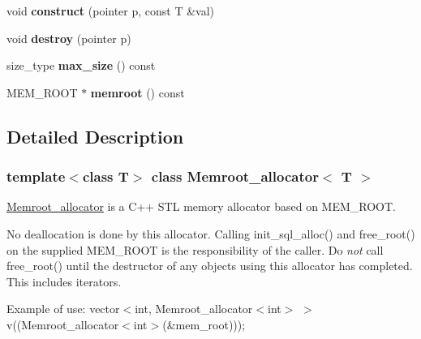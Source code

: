 \begin{DoxyCompactItemize}
void {\bfseries construct} (pointer p, const T \&val)
\item 
\mbox{\label{classMemroot__allocator_a5da35317665bf9a9afecd64ded8cb21e}} 
void {\bfseries destroy} (pointer p)
\item 
\mbox{\label{classMemroot__allocator_afb7e55464577fd90b422581e6718f99d}} 
size\+\_\+type {\bfseries max\+\_\+size} () const
\item 
\mbox{\label{classMemroot__allocator_a424b2fe0a85967b87d4b3b6dff62a03f}} 
M\+E\+M\+\_\+\+R\+O\+OT $\ast$ {\bfseries memroot} () const
\end{DoxyCompactItemize}


\subsection{Detailed Description}
\subsubsection*{template$<$class T$>$\newline
class Memroot\+\_\+allocator$<$ T $>$}

\mbox{\hyperlink{classMemroot__allocator}{Memroot\+\_\+allocator}} is a C++ S\+TL memory allocator based on M\+E\+M\+\_\+\+R\+O\+OT.

No deallocation is done by this allocator. Calling init\+\_\+sql\+\_\+alloc() and free\+\_\+root() on the supplied M\+E\+M\+\_\+\+R\+O\+OT is the responsibility of the caller. Do {\itshape not} call free\+\_\+root() until the destructor of any objects using this allocator has completed. This includes iterators.

Example of use\+: vector$<$int, Memroot\+\_\+allocator$<$int$>$ $>$ v((Memroot\+\_\+allocator$<$int$>$(\&mem\+\_\+root)));

